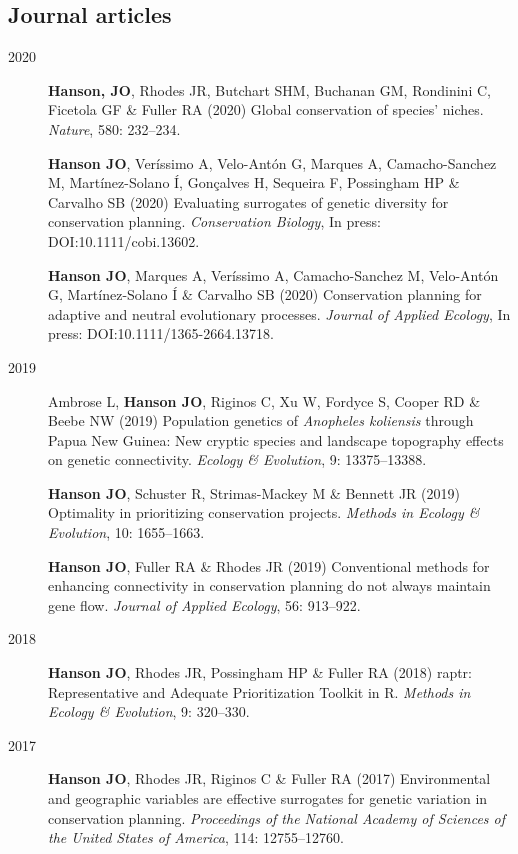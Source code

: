 \documentclass[12pt,a4paper]{article}
\begin{document}
\subsection*{Journal articles}
\begin{description}

\item[2020] \textbf{Hanson, JO}, Rhodes JR, Butchart SHM, Buchanan GM, Rondinini C, Ficetola GF \& Fuller RA (2020) Global conservation of species' niches. \textit{Nature}, 580: 232--234.

\item[] \textbf{Hanson JO}, Veríssimo A, Velo-Antón G, Marques A, Camacho-Sanchez M, Martínez-Solano Í, Gonçalves H, Sequeira F, Possingham HP \& Carvalho SB (2020) Evaluating surrogates of genetic diversity for conservation planning. \textit{Conservation Biology}, In press: DOI:10.1111/cobi.13602.

\item[] \textbf{Hanson JO}, Marques A, Veríssimo A, Camacho-Sanchez M, Velo-Antón G, Martínez-Solano Í \& Carvalho SB (2020) Conservation planning for adaptive and neutral evolutionary processes. \textit{Journal of Applied Ecology}, In press: DOI:10.1111/1365-2664.13718.

\item[2019] Ambrose L, \textbf{Hanson JO}, Riginos C, Xu W, Fordyce S, Cooper RD \& Beebe NW (2019) Population genetics of \textit{Anopheles koliensis} through Papua New Guinea: New cryptic species and landscape topography effects on genetic connectivity. \textit{Ecology \& Evolution}, 9: 13375--13388.

\item[] \textbf{Hanson JO}, Schuster R, Strimas-Mackey M \& Bennett JR (2019) Optimality in prioritizing conservation projects. \textit{Methods in Ecology \& Evolution}, 10: 1655--1663.

\item[] \textbf{Hanson JO}, Fuller RA \& Rhodes JR (2019) Conventional methods for enhancing connectivity in conservation planning do not always maintain gene flow. \textit{Journal of Applied Ecology}, 56: 913--922.

\item[2018] \textbf{Hanson JO}, Rhodes JR, Possingham HP \& Fuller RA (2018) raptr: Representative and Adequate Prioritization Toolkit in R. \textit{Methods in Ecology \& Evolution}, 9: 320--330.

\item[2017] \textbf{Hanson JO}, Rhodes JR, Riginos C \& Fuller RA (2017) Environmental and geographic variables are effective surrogates for genetic variation in conservation planning. \textit{Proceedings of the National Academy of Sciences of the United States of America}, 114: 12755--12760.


\end{description}
\end{document}
